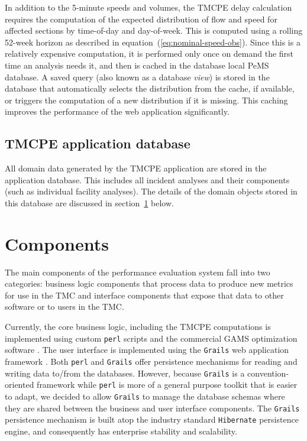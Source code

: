 \documentclass[12pt]{report}
\renewcommand{\fixme}[3][]{#1\xspace}
\newcounter{time}
\newcounter{space}
\begin{document}
In addition to the 5-minute speeds and volumes, the \ac{TMCPE} delay calculation
requires the computation of the expected distribution of flow and speed for
affected sections by time-of-day and day-of-week.  This is computed using a
rolling 52-week horizon as described in equation~(\ref{eq:nominal-speed-obs}).
Since this is a relatively expensive computation, it is performed only once on
demand the first time an analysis needs it, and then is cached in the database
local \ac{PeMS} database.  A saved query (also known as a database \emph{view})
is stored in the database that automatically selects the distribution from the
cache, if available, or triggers the computation of a new distribution if it is
missing.  This caching improves the performance of the web application
significantly.


\subsection{TMCPE application database}
\label{sec:tmcpe-app-database}

All domain data generated by the \ac{TMCPE} application are stored in the
application database.  This includes all incident analyses and their components
(such as individual facility analyses).  The details of the domain objects
stored in this database are discussed in section~\ref{sec:components} below.


\section{Components}
\label{sec:components}

The main components of the performance evaluation system fall into two
categories: business logic components that process data to produce new metrics
for use in the \ac{TMC} and interface components that expose that data to other
software or to users in the \ac{TMC}.  

Currently, the core business logic, including the \ac{TMCPE} computations is
implemented using custom \texttt{perl} scripts and the commercial \ac{GAMS}
optimization software \citep{rosenthal10:_gams}.  The user interface is
implemented using the \texttt{Grails} web application framework
\citep{rocher09:_grail_framew_refer_docum}.  Both \texttt{perl} and
\texttt{Grails} offer persistence mechanisms for reading and writing data
to/from the databases.  However, because \texttt{Grails} is a
convention-oriented framework while \texttt{perl} is more of a general purpose
toolkit that is easier to adapt, we decided to allow \texttt{Grails} to manage
the database schemas where they are shared between the business and user
interface components.  The \texttt{Grails} persistence mechanism is built atop
the industry standard \texttt{Hibernate} persistence
\citep{king10:_hiber_relat_persis_idiom_java} engine, and consequently has
enterprise stability and scalability.
\end{document}
